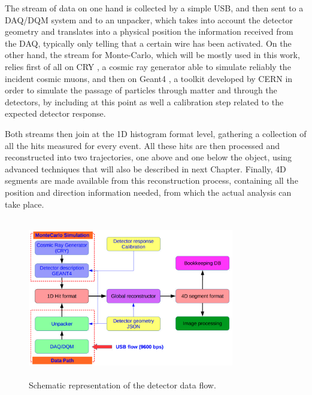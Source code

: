 \documentclass[a4paper, 11pt, twoside, openright]{report}
\begin{document}
The stream of data on one hand is collected by a simple USB, and then sent to a DAQ/DQM system and to an unpacker, which takes into account the detector geometry and translates into a physical position the information received from the DAQ, typically only telling that a certain wire has been activated. On the other hand, the stream for Monte-Carlo, which will be mostly used in this work, relies first of all on CRY \cite{CRY}, a cosmic ray generator able to simulate reliably the incident cosmic muons, and then on Geant4 \cite{Geant4}, a toolkit developed by CERN in order to simulate the passage of particles through matter and through the detectors, by including at this point as well a calibration step related to the expected detector response.

Both streams then join at the 1D histogram format level, gathering a collection of all the hits measured for every event. All these hits are then processed and reconstructed into two trajectories, one above and one below the object, using advanced techniques that will also be described in next Chapter. Finally, 4D segments are made available from this reconstruction process, containing all the position and direction information needed, from which the actual analysis can take place.

\begin{figure}[htbp]
\begin{center}
\includegraphics[width=9cm, height=7cm]{figs/dataFlow.png}
\caption{Schematic representation of the detector data flow.}
\label{fig:dataFlow}
\end{center}
\end{figure}
\end{document}
